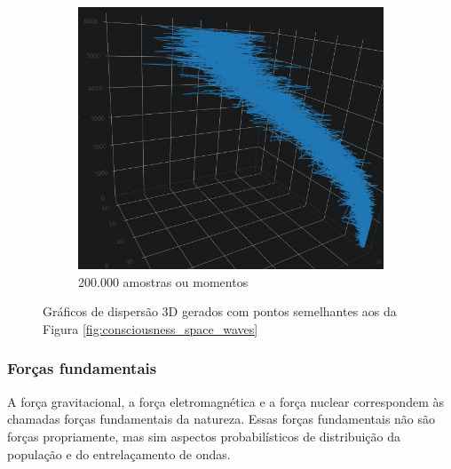 \begin{figure}[H]
		\begin{subfigure}[H]{0.47\linewidth}
		\centering
		\includegraphics[width=1\linewidth]{sections/images/consciousness_space_3DScatter_200000-2.jpg}
		\caption{200.000 amostras ou momentos}
		\label{fig:consciousness_space_3DScatter_200000-2}
		\end{subfigure}%
	\caption{Gráficos de dispersão 3D gerados com pontos semelhantes aos da Figura \ref{fig:consciousness_space_waves}}
	\end{figure}

\subsubsection{Forças fundamentais}
A força gravitacional, a força eletromagnética e a força nuclear correspondem às chamadas forças fundamentais da natureza. Essas forças fundamentais não são forças propriamente, mas sim aspectos probabilísticos de distribuição da população e do entrelaçamento de ondas.

